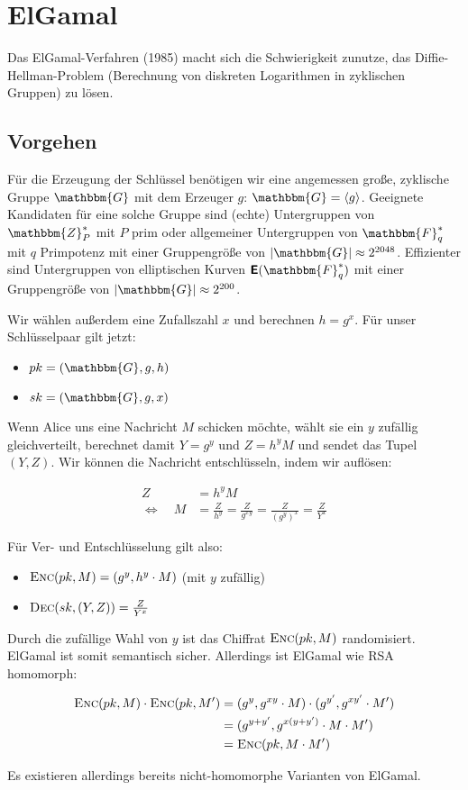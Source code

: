 \section{ElGamal}
\label{ch:asymenc:elgamal}
Das ElGamal-Verfahren (1985) macht sich die Schwierigkeit zunutze, das Diffie-Hellman-Problem (Berechnung von diskreten Logarithmen in zyklischen Gruppen) zu
lösen.

\subsection{Vorgehen}
Für die Erzeugung der Schlüssel benötigen wir eine angemessen große, zyklische Gruppe $\mathbbm{G}$ mit dem Erzeuger $g$: $\mathbbm{G} = \langle g \rangle$.
Geeignete Kandidaten für eine solche Gruppe sind (echte) Untergruppen von $\mathbbm{Z}^*_P$ mit $P$ prim oder allgemeiner Untergruppen von $\mathbbm{F}^*_q$
mit $q$ Primpotenz mit einer Gruppengröße von $|\mathbbm{G}| \approx 2^{2048}$. Effizienter sind Untergruppen von elliptischen Kurven
$\boldsymbol{\mathsf{E}}(\mathbbm{F}^*_q)$ mit einer Gruppengröße von $|\mathbbm{G}| \approx 2^{200}$.

Wir wählen außerdem eine Zufallszahl $x$ und berechnen $h = g^x$. Für unser Schlüsselpaar gilt jetzt: 

\begin{itemize}
  \item $pk = (\mathbbm{G}, g, h)$
  \item $sk = (\mathbbm{G}, g, x)$
\end{itemize}

Wenn Alice uns eine Nachricht $M$ schicken möchte, wählt sie ein $y$ zufällig gleichverteilt, berechnet damit $Y = g^y$ und $Z = h^y M$ und sendet das Tupel
$(Y,Z)$. Wir können die Nachricht entschlüsseln, indem wir auflösen:

\begin{align*}
Z &= h^y M\\
\Leftrightarrow \quad M& = \frac{Z}{h^y}
 = \frac{Z}{g^{xy}}
 = \frac{Z}{(g^y)^x}
 = \frac{Z}{Y^x}
\end{align*}

Für Ver- und Entschlüsselung gilt also:
\begin{itemize}
  \item $\textsc{Enc}(pk,M) = (g^y, h^y \cdot M)$ (mit $y$ zufällig)
  \item $\textsc{Dec}(sk,(Y, Z)) = \frac{Z}{Y^x}$
\end{itemize}

Durch die zufällige Wahl von $y$ ist das Chiffrat $\textsc{Enc}({pk, M})$ randomisiert. ElGamal ist somit semantisch sicher. Allerdings ist ElGamal wie RSA
homomorph:

\begin{align*}
\textsc{Enc}({pk,M}) \cdot \textsc{Enc}({pk,M'})
&= (g^y, g^{xy} \cdot M) \cdot (g^{y'}, g^{xy'} \cdot M')\\
&= (g^{y+y'}, g^{x(y + y')} \cdot M \cdot M')\\
&= \textsc{Enc}({pk, M \cdot M'})
\end{align*}

Es existieren allerdings bereits nicht-homomorphe Varianten von ElGamal.
